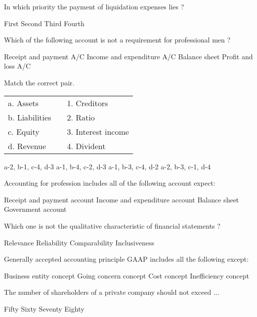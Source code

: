 \begin{questions}
\question In which priority the payment of liquidation expenses lies ?
  \begin{choices}
  \choice First
  \choice Second
  \choice Third
  \choice Fourth
  \end{choices}

\question Which of the following account is not a requirement for professional men ?
  \begin{choices}
  \choice Receipt and payment A/C
  \choice Income and expenditure A/C
  \choice Balance sheet
  \choice Profit and loss A/C
  \end{choices}

\question Match the correct pair.
  \begin{table}[h]
  \centering
  \begin{tabular}{lll}
    a. Assets & & 1. Creditors \\[2mm]
    b. Liabilities & & 2. Ratio \\
    c. Equity & & 3. Interest income \\
    d. Revenue & & 4. Divident \\
  \end{tabular}
  \end{table}
  \begin{choices}
  \choice a-2, b-1, c-4, d-3
  \choice a-1, b-4, c-2, d-3
  \choice a-1, b-3, c-4, d-2
  \choice a-2, b-3, c-1, d-4
  \end{choices}

\question Accounting for profession includes all of the following account expect:
  \begin{choices}
  \choice Receipt and payment account
  \choice Income and expenditure account
  \choice Balance sheet
  \choice Government account
  \end{choices}

\question Which one is not the qualitative characteristic of financial statements ?
  \begin{choices}
  \choice Relevance
  \choice Reliability
  \choice Comparability
  \choice Inclusiveness
  \end{choices}

\question Generally accepted accounting principle GAAP includes all the following except:
  \begin{choices}
  \choice Business entity concept
  \choice Going concern concept
  \choice Cost concept
  \choice Inefficiency concept
  \end{choices}

\question The number of shareholders of a private company should not exceed ...
  \begin{choices}
  \choice Fifty
  \choice Sixty
  \choice Seventy
  \choice Eighty
  \end{choices}


\end{questions}
